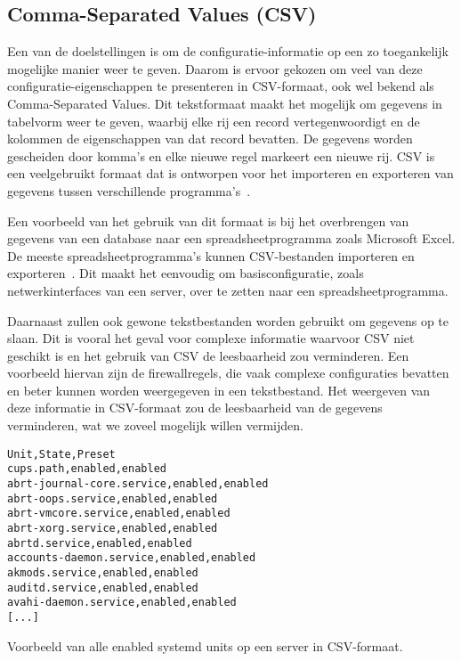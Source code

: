 \subsection{Comma-Separated Values (CSV)}
\label{poc_functionaliteiten_csv}

Een van de doelstellingen is om de configuratie-informatie op een zo toegankelijk mogelijke manier weer te geven.
Daarom is ervoor gekozen om veel van deze configuratie-eigenschappen te presenteren in CSV-formaat, ook wel bekend als Comma-Separated Values.
Dit tekstformaat maakt het mogelijk om gegevens in tabelvorm weer te geven, waarbij elke rij een record vertegenwoordigt en de kolommen de eigenschappen van dat record bevatten.
De gegevens worden gescheiden door komma's en elke nieuwe regel markeert een nieuwe rij.
CSV is een veelgebruikt formaat dat is ontworpen voor het importeren en exporteren van gegevens tussen verschillende programma's~\autocite{wikipedia2024csv}.

Een voorbeeld van het gebruik van dit formaat is bij het overbrengen van gegevens van een database naar een spreadsheetprogramma zoals Microsoft Excel.
De meeste spreadsheetprogramma's kunnen CSV-bestanden importeren en exporteren~\autocite{wikipedia2024csv}.
Dit maakt het eenvoudig om basisconfiguratie, zoals netwerkinterfaces van een server, over te zetten naar een spreadsheetprogramma.

Daarnaast zullen ook gewone tekstbestanden worden gebruikt om gegevens op te slaan.
Dit is vooral het geval voor complexe informatie waarvoor CSV niet geschikt is en het gebruik van CSV de leesbaarheid zou verminderen.
Een voorbeeld hiervan zijn de firewallregels, die vaak complexe configuraties bevatten en beter kunnen worden weergegeven in een tekstbestand.
Het weergeven van deze informatie in CSV-formaat zou de leesbaarheid van de gegevens verminderen, wat we zoveel mogelijk willen vermijden.

\begin{listing}
  \begin{verbatim}
Unit,State,Preset
cups.path,enabled,enabled
abrt-journal-core.service,enabled,enabled
abrt-oops.service,enabled,enabled
abrt-vmcore.service,enabled,enabled
abrt-xorg.service,enabled,enabled
abrtd.service,enabled,enabled
accounts-daemon.service,enabled,enabled
akmods.service,enabled,enabled
auditd.service,enabled,enabled
avahi-daemon.service,enabled,enabled
[...]
  \end{verbatim}
  \caption{Voorbeeld van alle enabled systemd units op een server in CSV-formaat.}
  \label{lst:poc-network-csv}
\end{listing}

